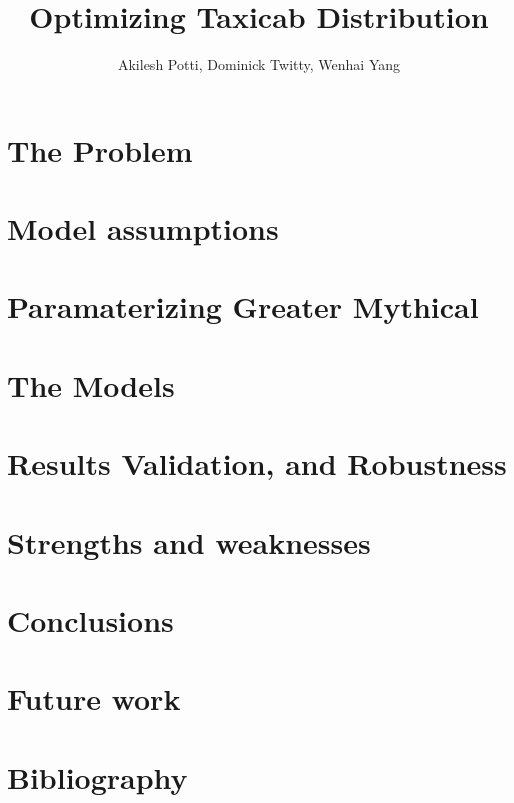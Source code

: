 \documentclass{article}
\begin{document}
\title{Optimizing Taxicab Distribution}
\author{Akilesh Potti, Dominick Twitty, Wenhai Yang}
\maketitle

\begin{abstract}
\end{abstract}

\section{The Problem}

\section{Model assumptions}

\section{Paramaterizing Greater Mythical}

\section{The Models}

\section{Results Validation, and Robustness}

\section{Strengths and weaknesses}

\section{Conclusions}

\section{Future work}

\section{Bibliography}
\end{document}

